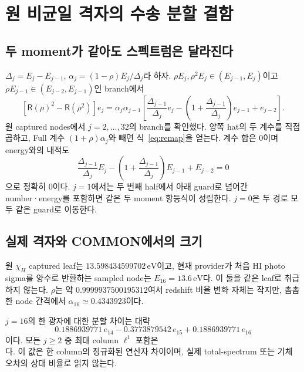 \documentclass[11pt,a4paper]{article}
\newcommand{\R}{\mathsf R}
\begin{document}
\section{원 비균일 격자의 수송 분할 결함}\label{sec:remap}
\subsection{두 moment가 같아도 스펙트럼은 달라진다}
\(\Delta_j=E_j-E_{j-1}\), \(\alpha_j=(1-\rho)E_j/\Delta_j\)라 하자. $\rho E_j,\rho^2E_j\in(E_{j-1},E_j)$이고 $\rho E_{j-1}\in(E_{j-2},E_{j-1})$인 branch에서
\begin{equation}\label{eq:remap}
\boxed{[\R(\rho)^2-\R(\rho^2)]e_j
=\alpha_j\alpha_{j-1}\left[
\frac{\Delta_{j-1}}{\Delta_j}e_j
-\left(1+\frac{\Delta_{j-1}}{\Delta_j}\right)e_{j-1}+e_{j-2}\right].}
\end{equation}
원 captured nodes에서 $j=2,\ldots,32$의 branch를 확인했다. 양쪽 hat의 두 계수를 직접 곱하고, Full 계수 $(1+\rho)\alpha_j$와 빼면 식~\eqref{eq:remap}을 얻는다. 계수 합은 0이며 energy와의 내적도
\begin{equation}
\frac{\Delta_{j-1}}{\Delta_j}E_j
-\left(1+\frac{\Delta_{j-1}}{\Delta_j}\right)E_{j-1}+E_{j-2}=0
\end{equation}
으로 정확히 0이다. $j=1$에서는 두 번째 half에서 아래 guard로 넘어간 number·energy를 포함하면 같은 두 moment 항등식이 성립한다. $j=0$은 두 경로 모두 같은 guard로 이동한다.\cite{theory,geometry,result}

\subsection{실제 격자와 COMMON에서의 크기}
원 $\chi_H$ captured leaf는 $13.598434599702\,\mathrm{eV}$이고, 현재 provider가 처음 HI photo sigma를 양수로 반환하는 sampled node는 $E_{16}=13.6\,\mathrm{eV}$다. 이 둘을 같은 leaf로 취급하지 않는다. $\rho$는 약 $0.9999937500195312$여서 redshift 비율 변화 자체는 작지만, 촘촘한 node 간격에서 $\alpha_{16}\simeq0.4343923$이다.


$j=16$의 한 광자에 대한 분할 차이는 대략
\begin{equation}
0.1886939771\,e_{14}-0.3773879542\,e_{15}+0.1886939771\,e_{16}
\end{equation}
이다. 모든 $j\ge2$ 중 최대 column $\ell^1$ 포함은
\begin{equation}
[0.7547759083005,\ 0.7547759083006]
\end{equation}
다. 이 값은 한 column의 정규화된 연산자 차이이며, 실제 total-spectrum 또는 기체 오차의 상대 비율로 읽지 않는다.
\end{document}

